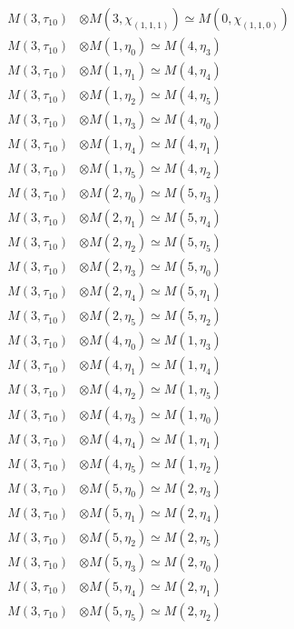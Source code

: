 \begin{align*}
M(3,\tau_{10}) &\otimes M(3,\chi_{(1,1,1)}) \simeq M(0,\chi_{(1,1,0)}) \\
M(3,\tau_{10}) &\otimes M(1,\eta_{0}) \simeq M(4,\eta_{3}) \\
M(3,\tau_{10}) &\otimes M(1,\eta_{1}) \simeq M(4,\eta_{4}) \\
M(3,\tau_{10}) &\otimes M(1,\eta_{2}) \simeq M(4,\eta_{5}) \\
M(3,\tau_{10}) &\otimes M(1,\eta_{3}) \simeq M(4,\eta_{0}) \\
M(3,\tau_{10}) &\otimes M(1,\eta_{4}) \simeq M(4,\eta_{1}) \\
M(3,\tau_{10}) &\otimes M(1,\eta_{5}) \simeq M(4,\eta_{2}) \\
M(3,\tau_{10}) &\otimes M(2,\eta_{0}) \simeq M(5,\eta_{3}) \\
M(3,\tau_{10}) &\otimes M(2,\eta_{1}) \simeq M(5,\eta_{4}) \\
M(3,\tau_{10}) &\otimes M(2,\eta_{2}) \simeq M(5,\eta_{5}) \\
M(3,\tau_{10}) &\otimes M(2,\eta_{3}) \simeq M(5,\eta_{0}) \\
M(3,\tau_{10}) &\otimes M(2,\eta_{4}) \simeq M(5,\eta_{1}) \\
M(3,\tau_{10}) &\otimes M(2,\eta_{5}) \simeq M(5,\eta_{2}) \\
M(3,\tau_{10}) &\otimes M(4,\eta_{0}) \simeq M(1,\eta_{3}) \\
M(3,\tau_{10}) &\otimes M(4,\eta_{1}) \simeq M(1,\eta_{4}) \\
M(3,\tau_{10}) &\otimes M(4,\eta_{2}) \simeq M(1,\eta_{5}) \\
M(3,\tau_{10}) &\otimes M(4,\eta_{3}) \simeq M(1,\eta_{0}) \\
M(3,\tau_{10}) &\otimes M(4,\eta_{4}) \simeq M(1,\eta_{1}) \\
M(3,\tau_{10}) &\otimes M(4,\eta_{5}) \simeq M(1,\eta_{2}) \\
M(3,\tau_{10}) &\otimes M(5,\eta_{0}) \simeq M(2,\eta_{3}) \\
M(3,\tau_{10}) &\otimes M(5,\eta_{1}) \simeq M(2,\eta_{4}) \\
M(3,\tau_{10}) &\otimes M(5,\eta_{2}) \simeq M(2,\eta_{5}) \\
M(3,\tau_{10}) &\otimes M(5,\eta_{3}) \simeq M(2,\eta_{0}) \\
M(3,\tau_{10}) &\otimes M(5,\eta_{4}) \simeq M(2,\eta_{1}) \\
M(3,\tau_{10}) &\otimes M(5,\eta_{5}) \simeq M(2,\eta_{2}) \\
\end{align*}

